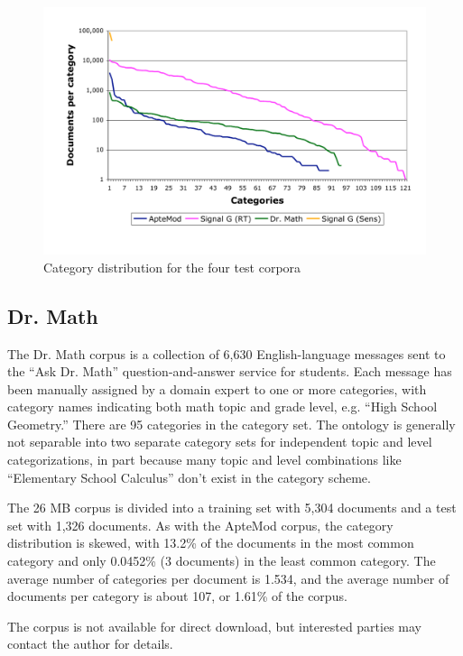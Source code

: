 \begin{figure}
\begin{center}
\includegraphics[width=\linewidth]{figures/Corpora-catdist.pdf}
\caption{Category distribution for the four test corpora}
\label{Corpora-catdist}
\end{center}
\end{figure}


\subsection{Dr. Math}

The Dr. Math corpus is a collection of 6,630 English-language messages
sent to the ``Ask Dr. Math'' question-and-answer service for
students.\cite{drmath} Each message has been manually assigned by a
domain expert to one or more categories,
with category names indicating both math topic and grade level,
e.g. ``High School Geometry.''  There are 95 categories in the
category set.  The ontology is generally not
separable into two separate category sets for independent topic and
level categorizations, in part because many topic and level
combinations like ``Elementary School Calculus'' don't exist in the
category scheme.

The 26 MB corpus is divided into a training set with 5,304 documents
and a test set with 1,326 documents.  As with the ApteMod corpus, the
category distribution is skewed, with 13.2\% of the documents in the
most common category and only 0.0452\% (3 documents) in the least
common category.  The average number of categories per document is
1.534, and the average number of documents per category is about 107,
or 1.61\% of the corpus.

The corpus is not available for direct download, but interested
parties may contact the author for details.


